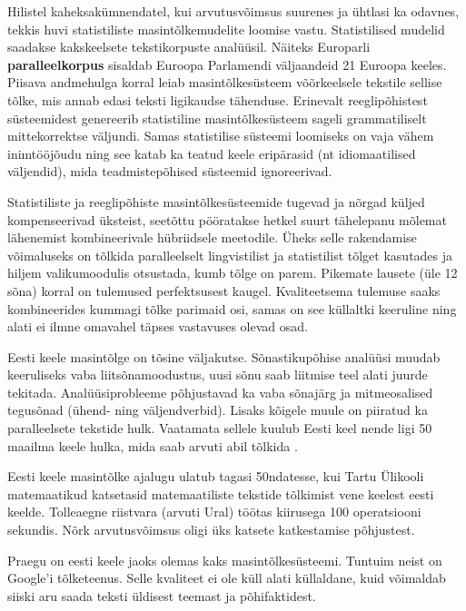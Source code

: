 \begin{multicols}{2}
Hilistel kaheksakümnendatel, kui arvutusvõimsus suurenes ja ühtlasi ka odavnes, tekkis huvi statistiliste masintõlkemudelite loomise vastu. 
Statistilised mudelid saadakse kakskeelsete tekstikorpuste analüüsil. 
Näiteks Europarli \textbf{paralleelkorpus} sisaldab Euroopa Parlamendi väljaandeid 21 Euroopa keeles. 
Piisava andmehulga korral leiab masintõlkesüsteem võõrkeelsele tekstile sellise tõlke, mis annab edasi teksti ligikaudse tähenduse. 
Erinevalt reeglipõhistest süsteemidest genereerib statistiline masintõlkesüsteem sageli grammatiliselt mittekorrektse väljundi. 
Samas statistilise süsteemi loomiseks on vaja vähem inimtööjõudu ning see katab ka teatud keele eripärasid (nt idiomaatilised väljendid), mida teadmistepõhised süsteemid ignoreerivad. 


Statistiliste ja reeglipõhiste masintõlkesüsteemide tugevad ja nõrgad küljed kompenseerivad üksteist, seetõttu pööratakse hetkel suurt tähelepanu mõlemat lähenemist kombineerivale hübriidsele meetodile. 
Üheks selle rakendamise võimaluseks on tõlkida paralleelselt lingvistilist ja statistilist tõlget kasutades ja hiljem valikumoodulis otsustada, kumb tõlge on parem. 
Pikemate lausete (üle 12 sõna) korral on tulemused perfektsusest kaugel. 
Kvaliteetsema tulemuse saaks kombineerides kummagi tõlke parimaid osi, samas on see küllaltki keeruline ning alati ei ilmne omavahel täpses vastavuses olevad osad. 

Eesti keele masintõlge on tõsine väljakutse.  Sõnastikupõhise analüüsi muudab keeruliseks vaba liitsõnamoodustus, uusi sõnu saab liitmise teel alati juurde tekitada.  Analüüsiprobleeme põhjustavad ka vaba sõnajärg ja mitmeosalised tegusõnad (ühend- ning väljendverbid).  Lisaks kõigele muule on piiratud ka paralleelsete tekstide hulk.  Vaatamata sellele kuulub Eesti keel nende ligi 50 maailma keele hulka, mida saab arvuti abil tõlkida \cite{Koit}.

Eesti keele masintõlke ajalugu ulatub tagasi 50ndatesse, kui Tartu Ülikooli matemaatikud katsetasid matemaatiliste tekstide tõlkimist vene keelest eesti keelde.  Tolleaegne riistvara (arvuti Ural) töötas kiirusega 100 operatsiooni sekundis. Nõrk arvutusvõimsus oligi üks katsete katkestamise põhjustest.

Praegu on eesti keele jaoks olemas kaks masintõlkesüsteemi.  Tuntuim neist on Google’i tõlketeenus.  Selle kvaliteet ei ole küll alati küllaldane, kuid võimaldab \mbox{siiski} aru saada teksti üldisest teemast ja põhifaktidest.


\end{multicols}
